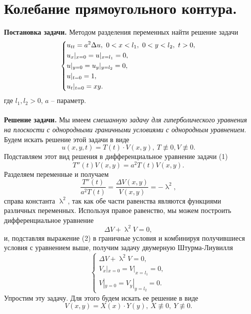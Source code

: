 \documentclass[a4paper, 12pt]{report}
\date{}
\numberwithin{equation}{section}
\renewcommand{\lambda}{\uplambda}
\begin{document}
	\section*{Колебание прямоугольного контура.}
	\textbf{Постановка задачи.}
	Методом разделения переменных найти решение задачи
	\begin{equation}
		\begin{dcases}
			u_{tt} = a^2\Delta u,\ 0<x<l_1,\ 0<y<l_2,\ t>0,\\
			u_x|_{x=0} = u|_{x=l_1} = 0,\\
			u|_{y=0} = u_y|_{y=l_2} = 0,\\
			u|_{t=0} = 1,\\
			u_t|_{t=0} = xy.
		\end{dcases}
	\end{equation}
	где $l_1, l_2 >0$, $a$ -- параметр.\\\\
	\textbf{Решение задачи.}
	Мы имеем \textit{смешанную задачу для гиперболического уравнения на плоскости с однородными граничными условиями с однородным уравнением}. Будем искать решение этой задачи в виде
	\begin{equation}
		u(x,y,t) = T(t)\cdot V(x,y),\ T\not \equiv 0, V \not \equiv 0.
	\end{equation}
	Подставляем этот вид решения в дифференциальное уравнение задачи (1)
	$$T''(t) V(x,y) = a^2 T(t) V(x,y).$$
	Разделяем переменные и получаем
	\begin{equation}
		\dfrac{T''(t)}{a^2 T(t)} = \dfrac{\Delta V(x,y)}{V(x,y)} = -\lambda^2,
	\end{equation}
	справа константа $\lambda^2$, так как обе части равенства являются функциями различных переменных.
	Используя правое равенство, мы можем построить дифференциальное уравнение
	$$\Delta V + \lambda ^2 V = 0,$$
	и, подставляя выражение (2) в граничные условия и комбинируя получившиеся условия с уравнением выше, получим задачу двумерную Штурма-Лиувилля
	\begin{equation}
		\begin{cases}
			\Delta V + \lambda ^2 V = 0,\\
			V_x|_{x=0} = V|_{x=l_1} = 0,\\
			V|_{y=0} = V_y|_{y=l_2} = 0.
		\end{cases}
	\end{equation}
	Упростим эту задачу. Для этого будем искать ее решение в виде
	\begin{equation}
		V(x,y) = X(x)\cdot Y(y),\ X\not \equiv 0,\ Y\not \equiv 0.
	\end{equation}
\end{document}
